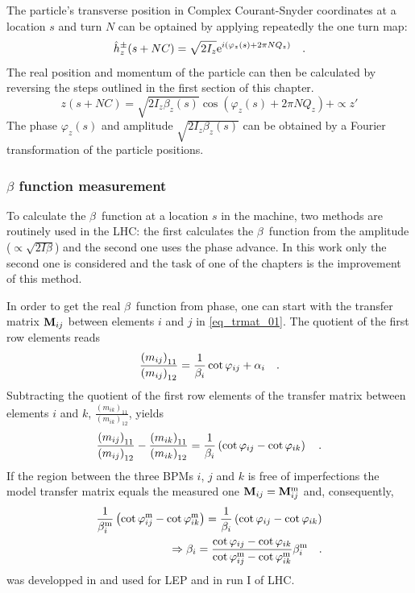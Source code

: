 The particle's transverse position in Complex Courant-Snyder coordinates at a location $s$ and turn
$N$ can be optained by applying repeatedly the one turn map:
%
\begin{equation}
    \hat{h}_z^\pm(s + NC) = \sqrt{2I_z} \text{e}^{i \left( \varphi_z(s) + 2\pi N Q_z\right)} 
    \quad .
\end{equation}
%
The real position and momentum of the particle can then be calculated by reversing the steps outlined
in the first section of this chapter.
%
\begin{equation}
    z(s + NC) = \sqrt{2I_z\beta_z(s)}\cos \left( \varphi_z(s) + 2\pi N Q_z\right) + \propto z'
\end{equation}
%
The phase $\varphi_z(s)$ and amplitude $\sqrt{2I_z\beta_z(s)}$ can be obtained by a Fourier transformation of
the particle positions.

\subsubsection{$\beta$ function measurement}
\label{sec_beta_meas}

To calculate the $\beta$~function at a location $s$ in the machine, two methods are routinely used
in the LHC: the first calculates the $\beta$~function from the amplitude ($\propto \sqrt{2I\beta}$)
and the second one uses the phase advance.
In this work only the second one is considered and the task of one of the chapters is the improvement
of this method.

In order to get the real $\beta$~function from phase, one can start with the transfer matrix $\mathbf{M}_{ij}$
between elements $i$ and $j$ in \eqref{eq_trmat_01}.
The quotient of the first row elements reads 
%
\begin{equation}
    \frac{\left(m_{ij}\right)_{11}}{\left(m_{ij}\right)_{12}} =
    \frac{1}{\beta_i} \cot\varphi_{ij} + \alpha_i
    \quad .
    \label{eq_trmat_quot}
\end{equation}
%
Subtracting the quotient of the first row elements of the transfer matrix between elements $i$ and $k$,
$ \frac{\left(m_{ik}\right)_{11}}{\left(m_{ik}\right)_{12}}$, yields
%
\begin{equation}
    \frac{\left(m_{ij}\right)_{11}}{\left(m_{ij}\right)_{12}} - \frac{\left(m_{ik}\right)_{11}}{\left(m_{ik}\right)_{12}}
    =
    \frac{1}{\beta_i} \left( \cot\varphi_{ij} - \cot\varphi_{ik}\right)
    \quad .
\end{equation}
%
If the region between the three BPMs $i$, $j$ and $k$ is free of imperfections
the model transfer matrix equals the measured one
$\mathbf{M}_{ij} = \mathbf{M}_{ij}^\text{m}$ and, consequently,
%
\begin{align}
    \frac{1}{\beta_i^\text{m}} \left( \cot\varphi_{ij}^\text{m} - \cot \varphi_{ik}^\text{m} \right)
    =
    \frac{1}{\beta_i} \left( \cot\varphi_{ij} - \cot \varphi_{ik} \right) \notag \\
    \Rightarrow
    \beta_i = \frac{
        \cot\varphi_{ij} - \cot\varphi_{ik}
    }{
        \cot\varphi_{ij}^\text{m} - \cot\varphi_{ik}^\text{m}
    }
    \beta_i^\text{m}
    \quad .
    \label{eq_3bpm_method}
\end{align}
%
 was developped in \cite{Castro1996} and used for LEP and in run I of LHC.

